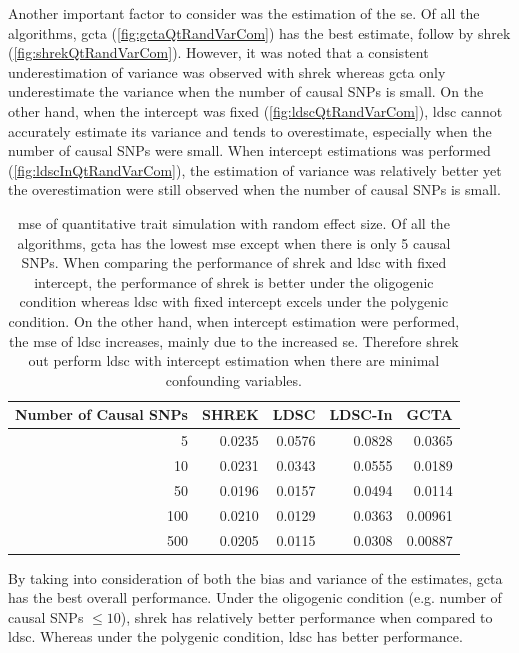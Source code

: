 		Another important factor to consider was the estimation of the \gls{se}. 
		Of all the algorithms, \gls{gcta} (\cref{fig:gctaQtRandVarCom}) has the best estimate, follow by \gls{shrek} (\cref{fig:shrekQtRandVarCom}).
		However, it was noted that a consistent underestimation of variance was observed with \gls{shrek} whereas \gls{gcta} only underestimate the variance when the number of causal \glspl{SNP} is small.
		On the other hand, when the intercept was fixed (\cref{fig:ldscQtRandVarCom}), \gls{ldsc} cannot accurately estimate its variance and tends to overestimate, especially when the number of causal \glspl{SNP} were small. 
		When intercept estimations was performed (\cref{fig:ldscInQtRandVarCom}), the estimation of variance was relatively better yet the overestimation were still observed when the number of causal \glspl{SNP} is small. 
		
		\begin{table}
			\centering
			\begin{tabular}{rrrrr}
				\toprule
				Number of Causal SNPs&	SHREK&	LDSC&	LDSC-In&	GCTA \\
				\midrule
				5	&	0.0235	&	0.0576	&	0.0828	&	0.0365\\
				10	&	0.0231	&	0.0343	&	0.0555	&	0.0189\\
				50	&	0.0196	&	0.0157	&	0.0494	&	0.0114\\
				100	&	0.0210	&	0.0129	&	0.0363	&	0.00961\\
				500	&	0.0205	&	0.0115	&	0.0308	&	0.00887\\
				\bottomrule
			\end{tabular}
			\caption[MSE of Quantitative Trait Simulation with Random Effect Size]{
				\Gls{mse} of quantitative trait simulation with random effect size.
				Of all the algorithms, \gls{gcta} has the lowest \gls{mse} except when there is only 5 causal \glspl{SNP}.
				When comparing the performance of \gls{shrek} and \gls{ldsc} with fixed intercept, the performance of \gls{shrek} is better under the oligogenic condition whereas \gls{ldsc} with fixed intercept excels under the polygenic condition. 
				On the other hand, when intercept estimation were performed, the \gls{mse} of \gls{ldsc} increases, mainly due to the increased \gls{se}. 
				Therefore \gls{shrek} out perform \gls{ldsc} with intercept estimation when there are minimal confounding variables.
			}
			\label{tab:mseQtRandom}
		\end{table}
		By taking into consideration of both the bias and variance of the estimates, \gls{gcta} has the best overall performance. 
		Under the oligogenic condition (e.g. number of causal \glspl{SNP} $\le10$), \gls{shrek} has relatively better performance when compared to \gls{ldsc}.
		Whereas under the polygenic condition, \gls{ldsc} has better performance. 
		
